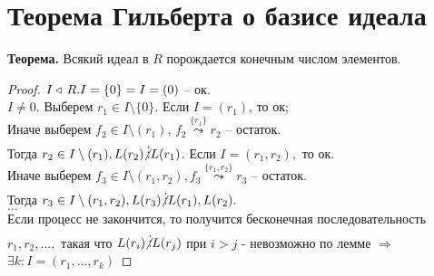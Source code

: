\section{Теорема Гильберта о базисе идеала}

\textbf{Теорема.} Всякий идеал в $R$ порождается конечным числом элементов. \\
\begin{proof}
    $I \triangleleft\, R. \\ I = \{0\} = I = (0)$ -- ок.\\
    $I \neq 0. $ Выберем $r_1 \in I \setminus \{0\}.$ Если $I = (r_1)$, то ок;\\
    Иначе выберем $f_2 \in I \setminus (r_1)$, $f_2 \overset{\{r_1\}}{\leadsto} r_2$ -- остаток.\\
    Тогда $r_2 \in I \setminus (r_1) , L(r_2) \!\!\not\vdots L(r_1)$. Если $I = (r_1, r_2), $ то ок.\\
    Иначе выберем $f_3 \in I \setminus (r_1, r_2), f_3 \overset{\{r_1, r_2\}}{\leadsto} r_3$ -- остаток.\\
    Тогда $r_3 \in I \setminus (r_1, r_2), L(r_3) \!\!\not\vdots L(r_1), L(r_2).$\\
    $\dotsc$\\
    Если процесс не закончится, то получится бесконечная последовательность $r_1, r_2, \dotsc,$ такая что $L(r_i) 
    \!\!\not\vdots L(r_j)$ при $i > j$ - невозможно по лемме $\Rightarrow$ $\exists k : I = (r_1, \dotsc, r_k)$
\end{proof}